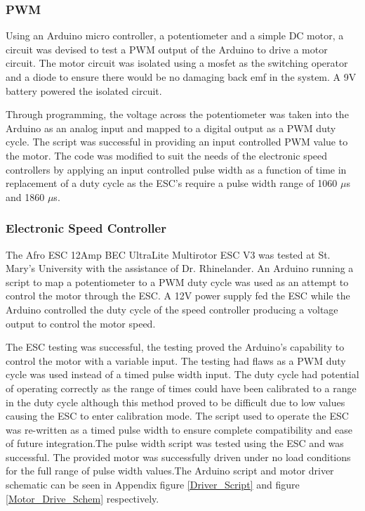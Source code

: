   \subsubsection{PWM}
  
Using an Arduino micro controller, a potentiometer and a simple DC motor, a circuit was devised to test a PWM output of the Arduino to drive a motor circuit. The motor circuit was isolated using a mosfet as the switching operator and a diode to ensure there would be no damaging back emf in the system. A 9V battery powered the isolated circuit.
  
Through programming, the voltage across the potentiometer was taken into the Arduino as an analog input and mapped to a digital output as a PWM duty cycle. The script was successful in providing an input controlled PWM value to the motor. The code was modified to suit the needs of the electronic speed controllers by applying an input controlled pulse width as a function of time in replacement of a duty cycle as the ESC's require a pulse width range of 1060 $\mu$s and 1860 $\mu$s.

  
  \subsubsection{Electronic Speed Controller}
  
The Afro ESC 12Amp BEC UltraLite Multirotor ESC V3 was tested at St. Mary's University with the assistance of Dr. Rhinelander. An Arduino running a script to map a potentiometer to a PWM duty cycle was used as an attempt to control the motor through the ESC. A 12V power supply fed the ESC while the Arduino controlled the duty cycle of the speed controller producing a voltage output to control the motor speed. 

The ESC testing was successful, the testing proved the Arduino's capability to control the motor with a variable input. The testing had flaws as a PWM duty cycle was used instead of a timed pulse width input. The duty cycle had potential of operating correctly as the range of times could have been calibrated to a range in the duty cycle although this method proved to be difficult due to low values causing the ESC to enter calibration mode. The script used to operate the ESC was re-written as a timed pulse width to ensure complete compatibility and ease of future integration.The pulse width script was tested using the ESC and was successful. The provided motor was successfully driven under no load conditions for the full range of pulse width values.The Arduino script and motor driver schematic can be seen in Appendix figure \ref{Driver_Script} and figure \ref{Motor_Drive_Schem} respectively.

